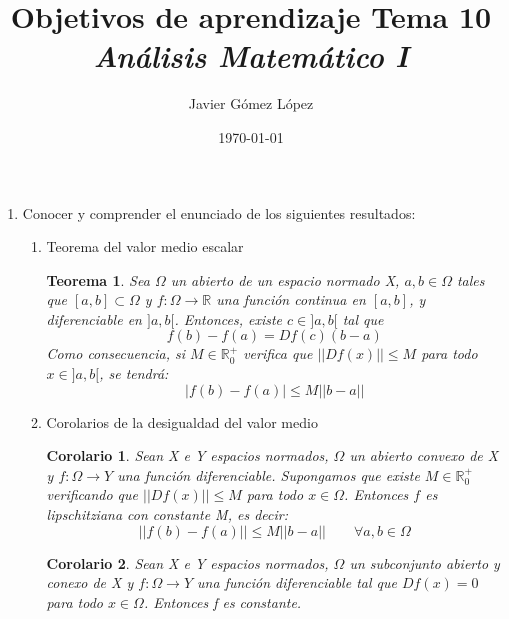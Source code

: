 \documentclass[a4paper, 12pt]{article}
\title{\textbf{Objetivos de aprendizaje Tema 10} \\ \textit{Análisis Matemático I}}
\author{Javier Gómez López}
\date{\today}
\newtheorem{teorema}{Teorema}
\newtheorem{corolario}{Corolario}
\begin{document}
\maketitle

\begin{enumerate}[label=\textbf{\arabic*}.]

\item Conocer y comprender el enunciado de los siguientes resultados:

\begin{enumerate}
	\item Teorema del valor medio escalar \\
	
	\begin{teorema}
	Sea \(\Omega\) un abierto de un espacio normado X, \(a,b \in \Omega\) tales que \([a,b] \subset \Omega\) y \(f: \Omega \to \mathbb{R}\) una función continua en \([a,b]\), y diferenciable en \(]a,b[\). Entonces, existe \(c \in ]a,b[\) tal que
	\begin{equation}\label{valor_medio_escalar_1}
		f(b) -f(a) = Df(c) (b-a)
	\end{equation}
	Como consecuencia, si \(M \in \mathbb{R}_0^+\) verifica que \(||Df(x)|| \leq M\) para todo \(x \in ]a,b[\), se tendrá:
	\begin{equation}\label{valor_medio_escalar_2}
		| f(b) - f(a)| \leq M ||b-a||
	\end{equation}
	\end{teorema}
	
	\bigskip
	
	\item Corolarios de la desigualdad del valor medio
	
	\begin{corolario}
	Sean X e Y espacios normados, \(\Omega\) un abierto convexo de X y \(f: \Omega \to Y\) una función diferenciable. Supongamos que existe \(M \in \mathbb{R}_0^+\) verificando que \(||Df(x)|| \leq M\) para todo \(x \in \Omega\). Entonces \(f\) es lipschitziana con constante M, es decir:
	\[
		||f(b) -f(a)|| \leq M ||b-a|| \qquad \forall a,b \in \Omega
	\]
	\end{corolario}
	
	\begin{corolario}
	Sean X e Y espacios normados, \(\Omega\) un subconjunto abierto y conexo de X y \(f: \Omega \to Y\) una función diferenciable tal que \(Df(x) = 0\) para todo \(x \in \Omega\). Entonces f es constante.
	\end{corolario}
\end{enumerate}


\end{enumerate}
\end{document}
